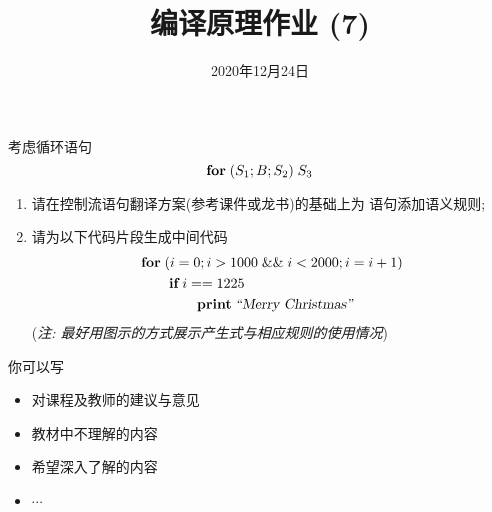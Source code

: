 \documentclass[a4paper, justified]{tufte-handout}
\title{编译原理作业 (7)}
\date{2020年12月24日}
\begin{document}
\maketitle
\noplagiarism %
\begin{abstract}
\end{abstract}
\beginrequired

\begin{problem}[score{10 = 5 + 5}]
  考虑循环语句
  \[
    \text{\bf for} \;(S_{1}; B; S_{2})\; S_{3}
  \]
  \begin{enumerate}[(1)]
    \item 请在控制流语句翻译方案(参考课件或龙书)的基础上为 \forkw{} 语句添加语义规则;
    \item 请为以下代码片段生成中间代码
      \begin{align*}
        &\text{\bf for}\; (i = 0; i > 1000 \;\&\&\; i < 2000; i = i + 1) \\
          &\qquad \text{\bf if}\; i == 1225\; \\
          &\qquad\qquad \text{\bf print}\; {\textsl{``Merry Christmas''}}
      \end{align*}
      ({\it 注: 最好用图示的方式展示产生式与相应规则的使用情况})
  \end{enumerate}
\end{problem}

\begin{solution}
\end{solution}



\beginfb

你可以写
\begin{itemize}
  \item 对课程及教师的建议与意见
  \item 教材中不理解的内容
  \item 希望深入了解的内容
  \item $\cdots$
\end{itemize}
\end{document}
